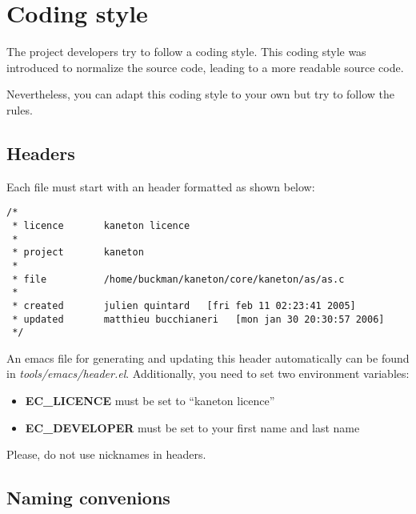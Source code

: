 
%
%

\chapter{Coding style}

\newpage

The \kaneton  project developers  try to follow  a coding  style. This
coding style was introduced to normalize the source code, leading to a
more readable source code.

Nevertheless, you  can adapt this coding  style to your own  but try to
follow the rules.

\section*{Headers}

Each file must start with an header formatted as shown below:

\begin{verbatim}
/*
 * licence       kaneton licence
 *
 * project       kaneton
 *
 * file          /home/buckman/kaneton/core/kaneton/as/as.c
 *
 * created       julien quintard   [fri feb 11 02:23:41 2005]
 * updated       matthieu bucchianeri   [mon jan 30 20:30:57 2006]
 */
\end{verbatim}

An emacs  file for generating  and updating this  header automatically
can be found in \textit{tools/emacs/header.el}. Additionally, you need
to set two environment variables:

\begin{itemize}
\item \textbf{EC\_LICENCE} must be set to ``kaneton licence''
\item \textbf{EC\_DEVELOPER} must be set to your first name and last name
\end{itemize}

Please, do not use nicknames in headers.

\section*{Naming convenions}

